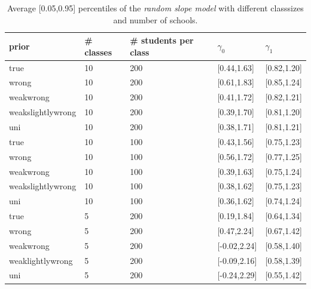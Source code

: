 \begin{table}[H]
\begin{center}
\begin{tabular}{l l l l  l}
prior & \# classes & \#  students per class &  $\gamma_0$ & $ \gamma_1$ \\
\hline
true & 10  &  200  &  [0.44,1.63]  &  [0.82,1.20]\\
wrong &10  &  200  &  [0.61,1.83]  &  [0.85,1.24]\\ %
weakwrong & 10  &  200  &  [0.41,1.72]  &  [0.82,1.21] \\  %
weakslightlywrong & 10  &  200  &  [0.39,1.70]  &  [0.81,1.20]\\ %
uni & 10  &  200  &  [0.38,1.71]  &  [0.81,1.21]\\ %
\hline
true &10  &  100  &  [0.43,1.56]  &  [0.75,1.23]\\
wrong&  10  &  100  &  [0.56,1.72]  &  [0.77,1.25]\\
weakwrong & 10  &  100  &  [0.39,1.63]  &  [0.75,1.24]\\
weakslightlywrong &10  &  100  &  [0.38,1.62]  &  [0.75,1.23]\\
uni & 10  &  100  &  [0.36,1.62]  &  [0.74,1.24]\\
\hline
true & 5  &  200  &  [0.19,1.84]  &  [0.64,1.34]\\
wrong &5  &  200  &  [0.47,2.24]  &  [0.67,1.42]\\
weakwrong & 5  &  200  &  [-0.02,2.24]  &  [0.58,1.40]\\
weaklightlywrong &5  &  200  &  [-0.09,2.16]  &  [0.58,1.39]\\
uni &5  &  200  &  [-0.24,2.29]  &  [0.55,1.42]\\
\end{tabular}
\end{center}
\caption{ Average [0.05,0.95] percentiles of the \emph{random slope model}  with different classsizes and number of schools. }
\label{tab:quantiles}
\end{table}

